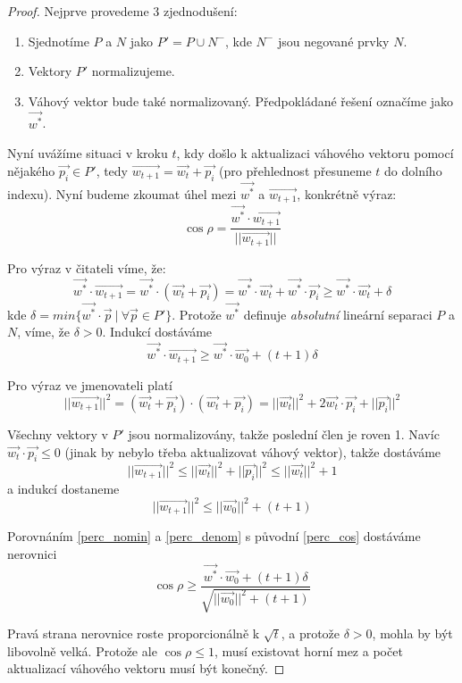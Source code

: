 \documentclass[11pt]{report} %
\begin{document}
\begin{proof}
Nejprve provedeme 3 zjednodušení:
\begin{enumerate}
	\leftskip 40pt
	\setlength{\itemsep}{0pt}
	\item Sjednotíme $P$ a $N$ jako $P' = P \cup N^-$, kde $N^-$ jsou negované prvky $N$.
	\item Vektory $P'$ normalizujeme.
	\item Váhový vektor bude také normalizovaný. Předpokládané řešení označíme jako $\vec{w^*}$.
\end{enumerate}

Nyní uvážíme situaci v kroku $t$, kdy došlo k aktualizaci váhového vektoru pomocí nějakého $\vec{p_i} \in P'$, tedy $\vec{w_{t+1}} = \vec{w_t} + \vec{p_i}$ (pro přehlednost přesuneme $t$ do dolního indexu). Nyní budeme zkoumat úhel mezi $\vec{w^*}$ a $\vec{w_{t+1}}$, konkrétně výraz:
\begin{equation}
\label{perc_cos}
\cos{\rho} = \frac{\vec{w^*} \cdot \vec{w_{t+1}}}{||\vec{w_{t+1}}||}
\end{equation}

Pro výraz v čitateli víme, že:
$$\vec{w^*}\cdot\vec{w_{t+1}} = \vec{w^*}\cdot(\vec{w_{t}} + \vec{p_i}) = \vec{w^*}\cdot\vec{w_{t}} + \vec{w^*}\cdot\vec{p_i} \geq \vec{w^*}\cdot\vec{w_{t}} + \delta$$ 
kde $\delta = min\{\vec{w^*}\cdot\vec{p}\ |\ \forall\vec{p} \in P'\}$. Protože $\vec{w^*}$ definuje \textit{absolutní} lineární separaci $P$ a $N$, víme, že $\delta > 0$. Indukcí dostáváme
\begin{equation}
	\label{perc_nomin}
	\vec{w^*}\cdot\vec{w_{t+1}} \geq \vec{w^*}\cdot\vec{w_0} + (t+1)\delta
\end{equation}

Pro výraz ve jmenovateli platí
$$||\vec{w_{t+1}}||^2 
= (\vec{w_{t}} + \vec{p_i}) \cdot (\vec{w_{t}} + \vec{p_i}) 
= ||\vec{w_t}||^2 + 2\vec{w_t}\cdot\vec{p_i} + ||\vec{p_i}||^2
$$

Všechny vektory v $P'$ jsou normalizovány, takže poslední člen je roven 1. Navíc $\vec{w_t}\cdot\vec{p_i} \leq 0$ (jinak by nebylo třeba aktualizovat váhový vektor), takže dostáváme
$$
||\vec{w_{t+1}}||^2 \leq ||\vec{w_t}||^2 + ||\vec{p_i}||^2 \leq ||\vec{w_t}||^2 + 1
$$
a indukcí dostaneme
\begin{equation}
\label{perc_denom}
||\vec{w_{t+1}}||^2 \leq ||\vec{w_0}||^2 + (t+1)
\end{equation}

Porovnáním \ref{perc_nomin} a \ref{perc_denom} s původní \ref{perc_cos} dostáváme nerovnici
$$
\cos\rho \geq \frac{\vec{w^*}\cdot\vec{w_0} + (t+1)\delta}{\sqrt{||\vec{w_0}||^2 + (t+1)}}
$$

Pravá strana nerovnice roste proporcionálně k $\sqrt{t}$, a protože $\delta > 0$, mohla by být libovolně velká. Protože ale $\cos\rho \leq 1$, musí existovat horní mez a počet aktualizací váhového vektoru musí být konečný.

\end{proof}
\end{document}
